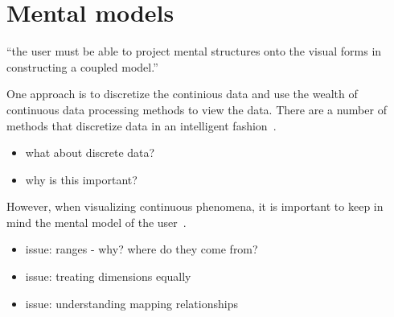 
\section{Mental models}
\label{sec:mental_models}


\cite{McNeil:2015}

``the user must be able to project mental structures
onto the visual forms in constructing a coupled model.''~\cite{Liu:2010a}

One approach is to discretize the continious data and use the wealth of continuous
data processing methods to view the data. There are a number of methods that
discretize data in an intelligent fashion~\cite{shannon, etc}. 

\begin{itemize}
\item what about discrete data?
\item why is this important?
\end{itemize}

However, when visualizing continuous phenomena, it is important to keep in mind
the mental model of the user~\cite{Liu:2010a}.

\begin{itemize}
\item issue: ranges - why? where do they come from?
\item issue: treating dimensions equally
\item issue: understanding mapping relationships
\end{itemize}

